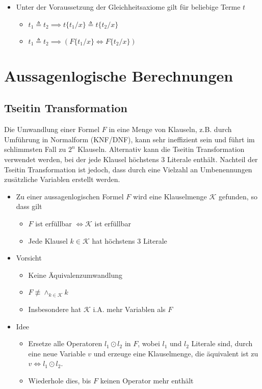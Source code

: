 \documentclass{scrartcl}
\begin{document}
\begin{itemize}
	\item Unter der Voraussetzung der Gleichheitsaxiome gilt für beliebige Terme $ t $
	\begin{itemize}
		\item $ t_1 \triangleq t_2 \implies t\{ t_1/x \} \triangleq t\{ t_2/x \} $
		\item $ t_1 \triangleq t_2 \implies (F\{ t_1/x \} \iff F\{ t_2/x \}) $
	\end{itemize}
\end{itemize}

\pagebreak
\section{Aussagenlogische Berechnungen}

\subsection{Tseitin Transformation}

Die Umwandlung einer Formel $ F $ in eine Menge von Klauseln, z.B. durch Umführung in Normalform (KNF/DNF), kann sehr ineffizient sein und führt im schlimmsten Fall zu $ 2^n $ Klauseln. Alternativ kann die Tseitin Transformation verwendet werden, bei der jede Klausel höchstens 3 Literale enthält. Nachteil der Tseitin Transformation ist jedoch, dass durch eine Vielzahl an Umbenennungen zusätzliche Variablen erstellt werden. \\

\begin{itemize}
	\item Zu einer aussagenlogischen Formel $ F $ wird eine Klauselmenge $ \mathcal{K} $ gefunden, so dass gilt
	\begin{itemize}
		\item $ F $ ist erfüllbar $ \iff \mathcal{K} $ ist erfüllbar
		\item Jede Klausel $ k \in \mathcal{K} $ hat höchstens 3 Literale
	\end{itemize}
	\item Vorsicht
	\begin{itemize}
		\item Keine Äquivalenzumwandlung
		\item $ F \not \equiv \wedge_{k \in \mathcal{K}} k $
		\item Insbesondere hat $ \mathcal{K} $ i.A. mehr Variablen als $ F $
	\end{itemize}
	\item Idee
	\begin{itemize}
		\item Ersetze alle Operatoren $ l_1 \odot l_2 $ in $ F $, wobei $ l_1 $ und $ l_2 $ Literale sind, durch eine neue Variable $ v $ und erzeuge eine Klauselmenge, die äquivalent ist zu $ v \iff l_1 \odot l_2 $.
		\item Wiederhole dies, bis $ F $ keinen Operator mehr enthält
	\end{itemize}
\end{itemize}
\end{document}
